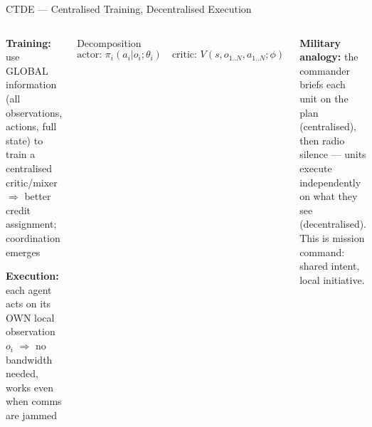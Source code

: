 \documentclass[aspectratio=169,10pt,t]{beamer}
\begin{document}
\begin{frame}{CTDE --- Centralised Training, Decentralised Execution}
\begin{columns}[T]
\begin{tl}\item \textbf{Training:} use GLOBAL information (all observations, actions, full state) to train a centralised critic/mixer $\Rightarrow$ better credit assignment; coordination emerges\item \textbf{Execution:} each agent acts on its OWN local observation $o_i$ $\Rightarrow$ no bandwidth needed, works even when comms are jammed\end{tl}
\begin{fbx}{Decomposition}\[\text{actor: }\pi_i(a_i|o_i;\theta_i)\quad\text{critic: }V(s,o_{1..N},a_{1..N};\phi)\]\end{fbx}
\begin{rbox}\scriptsize\textbf{Military analogy:} the commander briefs each unit on the plan (centralised), then radio silence --- units execute independently on what they see (decentralised). This is mission command: shared intent, local initiative.\end{rbox}
\end{columns}
\end{frame}
\end{document}
